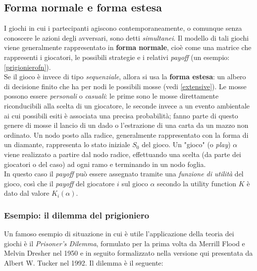 \subsection{Forma normale e forma estesa}
I giochi in cui i partecipanti agiscono contemporaneamente, o comunque senza conoscere le azioni degli avversari, sono detti \emph{simultanei}.
Il modello di tali giochi viene generalmente rappresentato in \textbf{forma normale}, cioè come una matrice che rappresenti i giocatori, le possibili strategie e i relativi \emph{payoff} (un esempio: \ref{prigionierofn}).\\
Se il gioco è invece di tipo \emph{sequenziale}, allora si usa la \textbf{forma estesa}: un albero di decisione finito che ha per nodi le possibili mosse (vedi \ref{extensive}).
Le mosse possono essere \emph{personali} o \emph{casuali}: le prime sono le mosse direttamente riconducibili alla scelta di un giocatore, le seconde invece a un evento ambientale ai cui possibili esiti è associata una precisa probabilità; fanno parte di questo genere di mosse il lancio di un dado o l'estrazione di una carta da un mazzo non ordinato.
Un nodo posto alla radice, generalmente rappresentato con la forma di un diamante, rappresenta lo stato iniziale $S_0$ del gioco.
Un "gioco" (o \emph{play}) $\alpha$ viene realizzato a partire dal nodo radice, effettuando una scelta (da parte dei giocatori o del caso) ad ogni ramo e terminando in un nodo foglia.\\
In questo caso il \emph{payoff} può essere assegnato tramite una \emph{funzione di utilità} del gioco, così che il \emph{payoff} del giocatore $i$ sul gioco $\alpha$ secondo la utility function $K$ è dato dal valore $K_i(\alpha)$. \cite{frank}


\subsubsection*{Esempio: il dilemma del prigioniero}

Un famoso esempio di situazione in cui è utile l'applicazione della teoria dei giochi è il \emph{Prisoner's Dilemma}, formulato per la prima volta da Merrill Flood e Melvin Dresher nel 1950 e in seguito formalizzato nella versione qui presentata da Albert W. Tucker nel 1992.
Il dilemma è il seguente:

